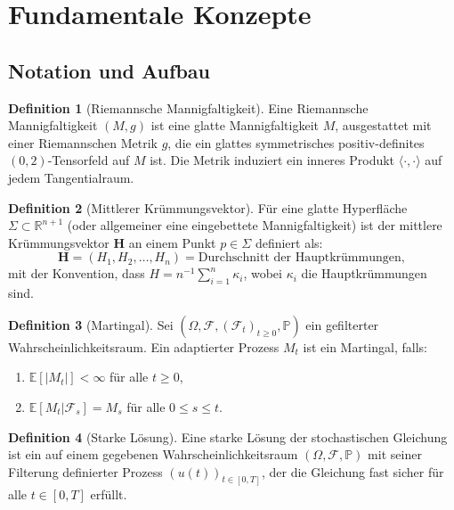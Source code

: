 \documentclass[a4paper,12pt]{article}
\theoremstyle{definition}
\newtheorem{definition}{Definition}
\begin{document}
\section{Fundamentale Konzepte}
\label{sec:fundamentals}

\subsection{Notation und Aufbau}

\begin{definition}[Riemannsche Mannigfaltigkeit]
	Eine Riemannsche Mannigfaltigkeit $(M, g)$ ist eine glatte Mannigfaltigkeit $M$, ausgestattet mit einer Riemannschen Metrik $g$, die ein glattes symmetrisches positiv-definites $(0,2)$-Tensorfeld auf $M$ ist. Die Metrik induziert ein inneres Produkt $\langle \cdot, \cdot \rangle$ auf jedem Tangentialraum.
\end{definition}

\begin{definition}[Mittlerer Krümmungsvektor]
	Für eine glatte Hyperfläche $\Sigma \subset \mathbb{R}^{n+1}$ (oder allgemeiner eine eingebettete Mannigfaltigkeit) ist der mittlere Krümmungsvektor $\mathbf{H}$ an einem Punkt $p \in \Sigma$ definiert als:
	\[
	\mathbf{H} = (H_1, H_2, \ldots, H_n) = \text{Durchschnitt der Hauptkrümmungen},
	\]
	mit der Konvention, dass $H = n^{-1} \sum_{i=1}^n \kappa_i$, wobei $\kappa_i$ die Hauptkrümmungen sind.
\end{definition}

\begin{definition}[Martingal]
	Sei $(\Omega, \mathcal{F}, (\mathcal{F}_t)_{t \geq 0}, \mathbb{P})$ ein gefilterter Wahrscheinlichkeitsraum. Ein adaptierter Prozess $M_t$ ist ein Martingal, falls:
	\begin{enumerate}
		\item $\mathbb{E}[|M_t|] < \infty$ für alle $t \geq 0$,
		\item $\mathbb{E}[M_t | \mathcal{F}_s] = M_s$ für alle $0 \leq s \leq t$.
	\end{enumerate}
\end{definition}

\begin{definition}[Starke Lösung]
	Eine starke Lösung der stochastischen Gleichung ist ein auf einem gegebenen Wahrscheinlichkeitsraum $(\Omega, \mathcal{F}, \mathbb{P})$ mit seiner Filterung definierter Prozess $(u(t))_{t \in [0,T]}$, der die Gleichung fast sicher für alle $t \in [0,T]$ erfüllt.
\end{definition}
\end{document}
